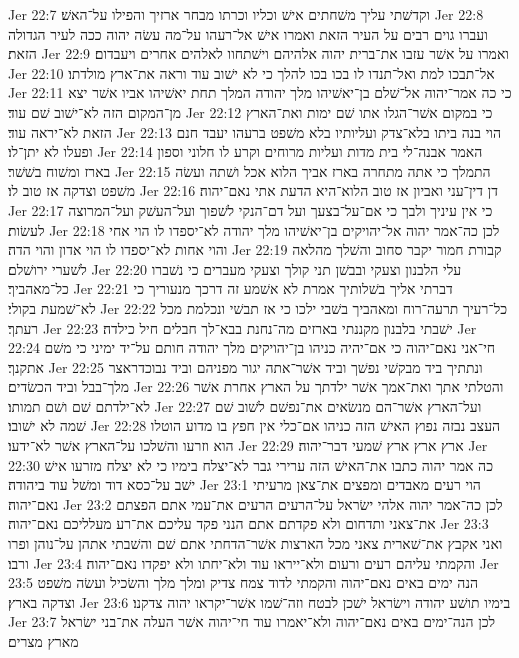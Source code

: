 Jer 22:7  וקדשׁתי עליך משׁחתים אישׁ וכליו וכרתו מבחר ארזיך והפילו על־האשׁ׃
Jer 22:8  ועברו גוים רבים על העיר הזאת ואמרו אישׁ אל־רעהו על־מה עשׂה יהוה ככה לעיר הגדולה הזאת׃
Jer 22:9  ואמרו על אשׁר עזבו את־ברית יהוה אלהיהם וישׁתחוו לאלהים אחרים ויעבדום׃
Jer 22:10  אל־תבכו למת ואל־תנדו לו בכו בכו להלך כי לא ישׁוב עוד וראה את־ארץ מולדתו׃
Jer 22:11  כי כה אמר־יהוה אל־שׁלם בן־יאשׁיהו מלך יהודה המלך תחת יאשׁיהו אביו אשׁר יצא מן־המקום הזה לא־ישׁוב שׁם עוד׃
Jer 22:12  כי במקום אשׁר־הגלו אתו שׁם ימות ואת־הארץ הזאת לא־יראה עוד׃
Jer 22:13  הוי בנה ביתו בלא־צדק ועליותיו בלא משׁפט ברעהו יעבד חנם ופעלו לא יתן־לו׃
Jer 22:14  האמר אבנה־לי בית מדות ועליות מרוחים וקרע לו חלוני וספון בארז ומשׁוח בשׁשׁר׃
Jer 22:15  התמלך כי אתה מתחרה בארז אביך הלוא אכל ושׁתה ועשׂה משׁפט וצדקה אז טוב לו׃
Jer 22:16  דן דין־עני ואביון אז טוב הלוא־היא הדעת אתי נאם־יהוה׃
Jer 22:17  כי אין עיניך ולבך כי אם־על־בצעך ועל דם־הנקי לשׁפוך ועל־העשׁק ועל־המרוצה לעשׂות׃
Jer 22:18  לכן כה־אמר יהוה אל־יהויקים בן־יאשׁיהו מלך יהודה לא־יספדו לו הוי אחי והוי אחות לא־יספדו לו הוי אדון והוי הדה׃
Jer 22:19  קבורת חמור יקבר סחוב והשׁלך מהלאה לשׁערי ירושׁלם׃
Jer 22:20  עלי הלבנון וצעקי ובבשׁן תני קולך וצעקי מעברים כי נשׁברו כל־מאהביך׃
Jer 22:21  דברתי אליך בשׁלותיך אמרת לא אשׁמע זה דרכך מנעוריך כי לא־שׁמעת בקולי׃
Jer 22:22  כל־רעיך תרעה־רוח ומאהביך בשׁבי ילכו כי אז תבשׁי ונכלמת מכל רעתך׃
Jer 22:23  ישׁבתי בלבנון מקננתי בארזים מה־נחנת בבא־לך חבלים חיל כילדה׃
Jer 22:24  חי־אני נאם־יהוה כי אם־יהיה כניהו בן־יהויקים מלך יהודה חותם על־יד ימיני כי משׁם אתקנך׃
Jer 22:25  ונתתיך ביד מבקשׁי נפשׁך וביד אשׁר־אתה יגור מפניהם וביד נבוכדראצר מלך־בבל וביד הכשׂדים׃
Jer 22:26  והטלתי אתך ואת־אמך אשׁר ילדתך על הארץ אחרת אשׁר לא־ילדתם שׁם ושׁם תמותו׃
Jer 22:27  ועל־הארץ אשׁר־הם מנשׂאים את־נפשׁם לשׁוב שׁם שׁמה לא ישׁובו׃
Jer 22:28  העצב נבזה נפוץ האישׁ הזה כניהו אם־כלי אין חפץ בו מדוע הוטלו הוא וזרעו והשׁלכו על־הארץ אשׁר לא־ידעו׃
Jer 22:29  ארץ ארץ ארץ שׁמעי דבר־יהוה׃
Jer 22:30  כה אמר יהוה כתבו את־האישׁ הזה ערירי גבר לא־יצלח בימיו כי לא יצלח מזרעו אישׁ ישׁב על־כסא דוד ומשׁל עוד ביהודה׃
Jer 23:1  הוי רעים מאבדים ומפצים את־צאן מרעיתי נאם־יהוה׃
Jer 23:2  לכן כה־אמר יהוה אלהי ישׂראל על־הרעים הרעים את־עמי אתם הפצתם את־צאני ותדחום ולא פקדתם אתם הנני פקד עליכם את־רע מעלליכם נאם־יהוה׃
Jer 23:3  ואני אקבץ את־שׁארית צאני מכל הארצות אשׁר־הדחתי אתם שׁם והשׁבתי אתהן על־נוהן ופרו ורבו׃
Jer 23:4  והקמתי עליהם רעים ורעום ולא־ייראו עוד ולא־יחתו ולא יפקדו נאם־יהוה׃
Jer 23:5  הנה ימים באים נאם־יהוה והקמתי לדוד צמח צדיק ומלך מלך והשׂכיל ועשׂה משׁפט וצדקה בארץ׃
Jer 23:6  בימיו תושׁע יהודה וישׂראל ישׁכן לבטח וזה־שׁמו אשׁר־יקראו יהוה צדקנו׃
Jer 23:7  לכן הנה־ימים באים נאם־יהוה ולא־יאמרו עוד חי־יהוה אשׁר העלה את־בני ישׂראל מארץ מצרים׃
